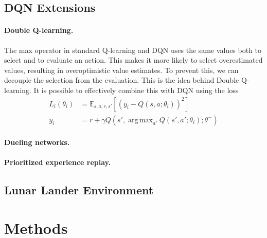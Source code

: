 \documentclass{article}
\DeclareMathOperator*{\argmax}{arg\,max}
\begin{document}
    \subsection{DQN Extensions}
    \label{subsec:extensions}

    \paragraph{Double Q-learning.}
    The max operator in standard Q-learning and DQN uses the same values both to select and to evaluate an action.
    This makes it more likely to select overestimated values, resulting in overoptimistic value estimates.
    To prevent this, we can decouple the selection from the evaluation.
    This is the idea behind Double Q-learning.
    It is possible to effectively combine this with DQN using the loss
    \begin{align}
        L_{i}(\theta_{i}) &= \mathbb{E}_{s, a, r, s'} \left[ \left( y_{i} - Q(s, a; \theta_{i}) \right)^2 \right] \\
        y_{i} &= r + \gamma Q(s', \argmax_{a'} Q(s', a'; \theta_{i}); \theta^{-})
    \end{align}

    \paragraph{Dueling networks.}
    \lipsum[1]

    \lipsum[2]

    \paragraph{Prioritized experience replay.}
    \lipsum[2]

    \lipsum[3]

    \subsection{Lunar Lander Environment}
    \label{subsec:lunarlander}
    \lipsum[3]

    \section{Methods}
    \label{sec:methods}
    \lipsum[1]
    \lipsum[2]

    \lipsum[3]
    \lipsum[4]



\printbibliography
\end{document}
